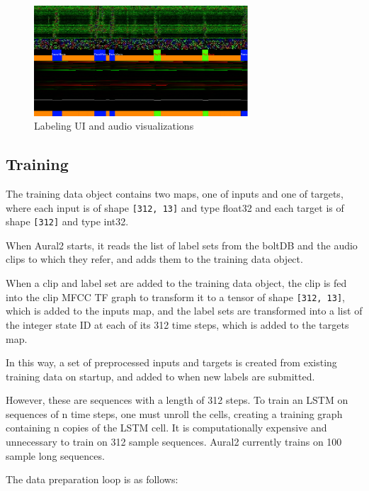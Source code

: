 \documentclass[conference]{IEEEtran}
\begin{document}
\begin{figure}[htbp]
\centerline{\includegraphics[width=80mm]{labeling_ui.png}}
\caption{Labeling UI and audio visualizations}
\label{fig}
\end{figure}

\subsection{Training}
The training data object contains two maps, one of inputs and one of
targets, where each input is of shape \texttt{[312, 13]} and type float32 and
each target is of shape \texttt{[312]} and type int32.

When Aural2 starts, it reads the list of label sets from the boltDB and
the audio clips to which they refer, and adds them to the training data
object.

When a clip and label set are added to the training data object,
the clip is fed into the clip MFCC TF graph to transform it to a tensor of
shape \texttt{[312, 13]}, which is added to the inputs map,
and the label sets are transformed into a list of the integer state ID at each of its 312 time steps,
which is added to the targets map.

In this way, a set of preprocessed inputs and targets is created from
existing training data on startup, and added to when new labels are
submitted.

However, these are sequences with a length of 312 steps.
To train an LSTM on sequences of n time steps, one must unroll the cells, creating a training graph containing n copies of the LSTM cell.
It is computationally expensive and unnecessary to train on 312 sample sequences.
Aural2 currently trains on 100 sample long sequences.

The data preparation loop is as follows:
\end{document}
